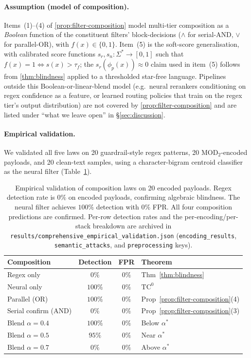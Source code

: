 \documentclass[letterpaper,twocolumn,10pt]{article}
\theoremstyle{definition}
\theoremstyle{remark}
\begin{document}
\paragraph{Assumption (model of composition).}
Items~(1)--(4) of \cref{prop:filter-composition} model multi-tier
composition as a \emph{Boolean} function of the constituent filters'
block-decisions ($\wedge$ for serial-AND, $\vee$ for parallel-OR), with
$f(x) \in \{0, 1\}$. Item~(5) is the soft-score generalisation, with
calibrated score functions $s_r, s_n\colon \Sigma^* \to [0,1]$ such that
$f(x) = 1 \iff s(x) > \tau_f$; the $s_r(\phi_p(x)) \approx 0$ claim used
in item~(5) follows from \cref{thm:blindness} applied to a thresholded
star-free language. Pipelines outside this Boolean-or-linear-blend
model (e.g.\ neural rerankers conditioning on regex confidence as a
feature, or learned routing policies that train on the regex tier's
output distribution) are not covered by \cref{prop:filter-composition}
and are listed under ``what we leave open'' in \S\ref{sec:discussion}.

\paragraph{Empirical validation.}
We validated all five laws on 20 guardrail-style regex patterns, 20
$\mathrm{MOD}_2$-encoded payloads, and 20 clean-text samples, using a
character-bigram centroid classifier as the neural filter
(Table~\ref{tab:composition-empirical}).

\begin{table}[!htbp]
\centering
\caption{Empirical validation of composition laws on 20 encoded payloads.
Regex detection rate is $0\%$ on encoded payloads, confirming algebraic blindness.
The neural filter achieves $100\%$ detection with $0\%$ FPR.
All four composition predictions are confirmed.
Per-row detection rates and the per-encoding/per-stack breakdown are
archived in \texttt{results/\allowbreak comprehensive\_\allowbreak empirical\_\allowbreak validation.json}
(\texttt{encoding\_results}, \texttt{semantic\_attacks}, and
\texttt{preprocessing} keys).}
\label{tab:composition-empirical}
\small
\begin{tabular}{lccl}
\toprule
Composition & Detection & FPR & Theorem \\
\midrule
Regex only & $0\%$ & $0\%$ & Thm~\ref{thm:blindness} \\
Neural only & $100\%$ & $0\%$ & $\mathrm{TC}^0$ \\
Parallel (OR) & $100\%$ & $0\%$ & Prop~\ref{prop:filter-composition}(4) \\
Serial confirm (AND) & $0\%$ & $0\%$ & Prop~\ref{prop:filter-composition}(3) \\
Blend $\alpha{=}0.4$ & $100\%$ & $0\%$ & Below $\alpha^*$ \\
Blend $\alpha{=}0.5$ & $95\%$ & $0\%$ & Near $\alpha^*$ \\
Blend $\alpha{=}0.7$ & $0\%$ & $0\%$ & Above $\alpha^*$ \\
\bottomrule
\end{tabular}
\end{table}
\end{document}
